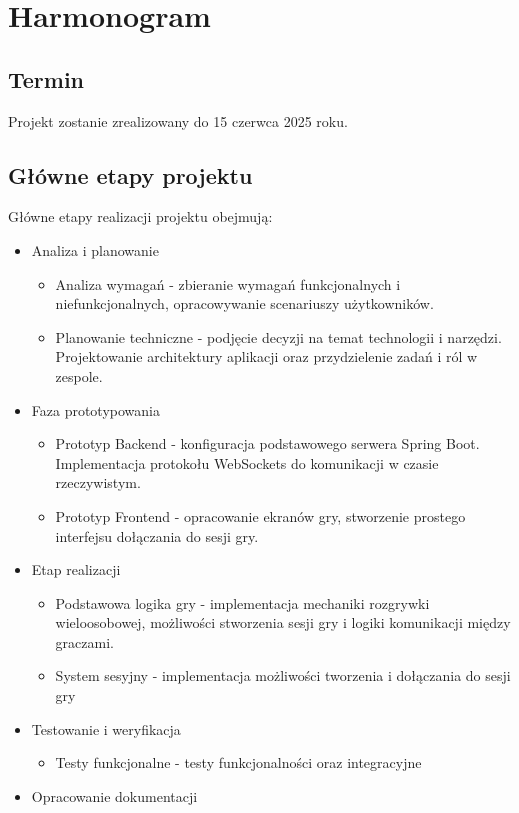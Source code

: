 \documentclass[12pt,a4paper]{book}
\begin{document}
\section{Harmonogram}
\subsection{Termin}
Projekt zostanie zrealizowany do 15 czerwca 2025 roku.

\subsection{Główne etapy projektu}
Główne etapy realizacji projektu obejmują:
\begin{itemize}
    \item Analiza i planowanie
    \begin{itemize}
        \item Analiza wymagań - zbieranie wymagań funkcjonalnych i niefunkcjonalnych, opracowywanie scenariuszy użytkowników.
        \item Planowanie techniczne - podjęcie decyzji na temat technologii i narzędzi. Projektowanie architektury aplikacji oraz przydzielenie zadań i ról w zespole.
    \end{itemize}
    \item Faza prototypowania
    \begin{itemize}
        \item Prototyp Backend - konfiguracja podstawowego serwera Spring Boot. Implementacja protokołu WebSockets do komunikacji w czasie rzeczywistym.
        \item Prototyp Frontend - opracowanie ekranów gry, stworzenie prostego interfejsu dołączania do sesji gry.
    \end{itemize}
    \item Etap realizacji
    \begin{itemize}
        \item Podstawowa logika gry - implementacja mechaniki rozgrywki wieloosobowej, możliwości stworzenia sesji gry i logiki komunikacji między graczami.
        \item System sesyjny - implementacja możliwości tworzenia i dołączania do sesji gry
    \end{itemize}
    \item Testowanie i weryfikacja
    \begin{itemize}
        \item Testy funkcjonalne - testy funkcjonalności oraz integracyjne
    \end{itemize}
    \item Opracowanie dokumentacji
\end{itemize}
\end{document}
